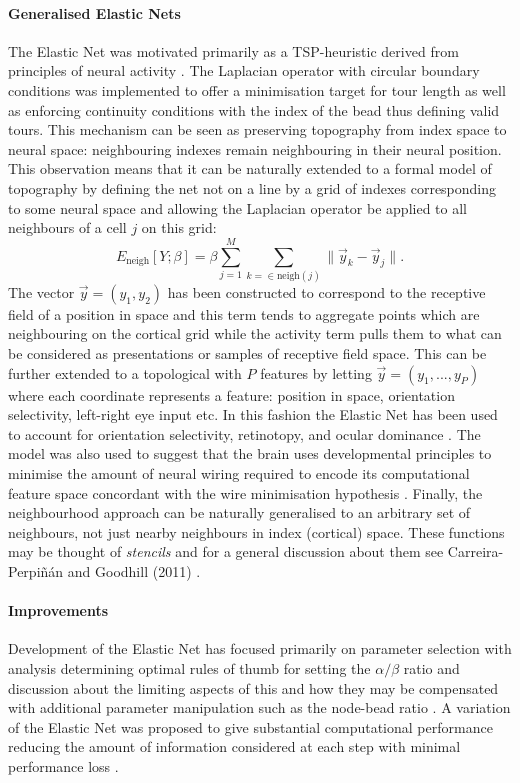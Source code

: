 \paragraph{Generalised Elastic Nets \label{sec:generalisedEN}}
The Elastic Net was motivated primarily as a TSP-heuristic derived from principles of neural activity \cite{Willshaw1976-ew}. The Laplacian operator with circular boundary conditions was implemented to offer a minimisation target for tour length as well as enforcing continuity conditions with the index of the bead thus defining valid tours. This mechanism can be seen as preserving topography from index space to neural space: neighbouring indexes remain neighbouring in their neural position. This observation means that it can be naturally extended to a formal model of topography by defining the net not on a line by a grid of indexes corresponding to some neural space and allowing the Laplacian operator be applied to all neighbours of a cell $j$ on this grid:
\begin{equation}
E_\text{neigh}[Y; \beta] = \beta \sum_{j=1}^{M}\sum_{k=\in\text{neigh}(j)} \lVert \vec{y}_k - \vec{y}_{j} \rVert.
\end{equation}
The vector $\vec{y} = (y_1, y_2)$ has been constructed to correspond to the receptive field of a position in space and this term tends to aggregate points which are neighbouring on the cortical grid while the activity term pulls them to what can be considered as presentations or samples of receptive field space. This can be further extended to a topological with $P$ features by letting $\vec{y} = (y_1,...,y_P)$ where each coordinate represents a feature: position in space, orientation selectivity, left-right eye input etc. In this fashion the Elastic Net has been used to account for orientation selectivity, retinotopy, and ocular dominance \cite{Goodhill2000-on, Goodhill1994-dn, Goodhill2000-vp, Goodhill1990-dr, Durbin1990-tn}. The model was also used to suggest that the brain uses developmental principles to minimise the amount of neural wiring required to encode its computational feature space concordant with the wire minimisation hypothesis \cite{Durbin1990-tn, Swindale1992-de, Swindale2001-gh, Koulakov2001-je}. Finally, the neighbourhood approach can be naturally generalised to an arbitrary set of neighbours, not just nearby neighbours in index (cortical) space. These functions may be thought of \textit{stencils} and for a general discussion about them see Carreira-Perpi{\~n}{\'a}n and Goodhill (2011) \cite{Carreira-Perpinan2011-aa}.
\paragraph{Improvements}
Development of the Elastic Net has focused primarily on parameter selection with analysis determining optimal rules of thumb for setting the $\alpha/\beta$ ratio and discussion about the limiting aspects of this and how they may be compensated with additional parameter manipulation such as the node-bead ratio \cite{Simmen1991-hm, Durbin1989-gs}. A variation of the Elastic Net was proposed to give substantial computational performance reducing the amount of information considered at each step with minimal performance loss \cite{Boeres1992-fo, Burr1988-fg}.

